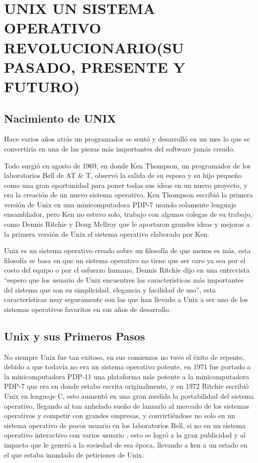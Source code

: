 \chapter*{UNIX UN SISTEMA OPERATIVO REVOLUCIONARIO(SU PASADO, PRESENTE Y FUTURO)}

\section*{Nacimiento de UNIX}
Hace  varios años  atrás un programador se sentó y  desarrolló   en un mes lo que se  convertiría  en una de las piezas más importantes del software jamás creado.

Todo surgió en agosto de 1969, en donde  Ken Thompson, un programador  de los laboratorios Bell de AT \& T, observó la salida de su esposa y su hijo pequeño  como una gran 
oportunidad para poner todas sus ideas en un nuevo proyecto, y era la creación de un nuevo sistema  operativo, Ken Thompson escribió la primera versión de Unix en una 
minicomputadora PDP-7 usando solamente lenguaje ensamblador, pero Ken no estuvo solo, trabajo con algunos  colegas  de su  trabajo, como  Dennis Ritchie y Doug Mcllroy  que 
le aportaron  grandes ideas y mejoras  a la primera versión  de Unix el sistema operativo  elaborado por Ken.

Unix  es  un sistema operativo  creado sobre un filosofía  de que  menos es más, esta  filosofía  se basa en que un sistema operativo no tiene que ser caro  ya sea  por el 
costo del equipo  o por el esfuerzo humano, Dennis Ritchie  dijo  en una entrevista “espero que los usuario de Unix  encuentres las características más importantes del 
sistema  que son su simplicidad, elegancia y facilidad de uso”, esta  características  muy seguramente son las  que han  llevado a Unix a ser  uno de los sistemas operativos favoritos en sus años de desarrollo.

\section*{Unix y sus Primeros Pasos}
No siempre Unix  fue  tan exitoso, en sus comienzos no tuvo  el éxito de repente, debido a que todavía no era un sistema operativo potente, en 1971 fue portado  a la 
minicomputadora PDP-11 una plataforma más potente a la minicomputadora PDP-7 que  era en donde estaba escrita originalmente, y  en  1972  Ritchie  escribió  Unix  en  
lenguaje  C, esto aumentó en una gran medida la portabilidad del sistema operativo, llegando al tan anhelado  sueño de lanzarlo al mercado de los sistemas operativos y 
competir con grandes empresas, y convirtiéndose  no solo en un sistema operativo de pocos  usuario  en  los laboratorios Bell,  si no en un sistema operativo interactivo con varios usuario , esto se logró  a la gran publicidad  y al  impacto que le generó  a la sociedad  de esa época, llevando a   ken  a un estado  en el que estaba inundado de peticiones de Unix.

